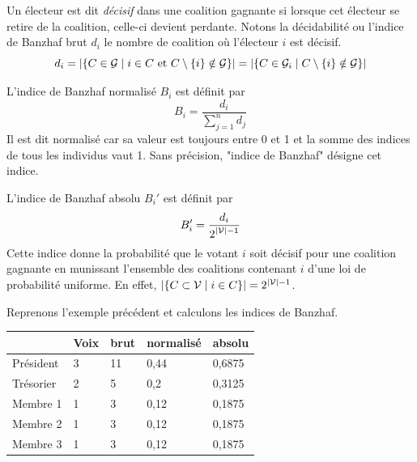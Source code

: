 \begin{definition}
	Un électeur est dit \textit{décisif} dans une coalition gagnante si lorsque cet électeur se retire de la coalition, celle-ci devient perdante. Notons la décidabilité ou l'indice de Banzhaf brut $d_i$ le nombre de coalition où l'électeur $i$ est décisif.
	\begin{equation}
		d_i
		= \left| \left\{ C \in \mathcal{G} \;|\; i \in C \text{ et } C \setminus \{i\} \notin \mathcal{G} \right\} \right|
		= \left| \left\{ C \in \mathcal{G}_i \;|\; C \setminus \{i\} \notin \mathcal{G} \right\} \right|
	\end{equation}
\end{definition}

\begin{definition}
	L'indice de Banzhaf normalisé $B_i$ est définit par
	\begin{equation}
		B_i = \frac{d_i}{\displaystyle \sum_{j=1}^{n} d_j}
	\end{equation}
	Il est dit normalisé car sa valeur est toujours entre 0 et 1 et la somme des indices de tous les individus vaut 1.
	Sans précision, "indice de Banzhaf" désigne cet indice.
	
	L'indice de Banzhaf absolu $B_i'$ est définit par
	\begin{equation}
		B_i' = \frac{d_i}{\displaystyle 2^{|\mathcal{V}| - 1}}
	\end{equation}
	Cette indice donne la probabilité que le votant $i$ soit décisif pour une coalition gagnante en munissant l'ensemble des coalitions contenant $i$ d'une loi de probabilité uniforme.
	En effet, $\left| \left\{ C \subset \mathcal{V} \;|\; i \in C \right\} \right| = 2^{|\mathcal{V}| - 1}$.
\end{definition}

\begin{exemple}
	Reprenons l'exemple précédent et calculons les indices de Banzhaf.
	\begin{center}
		\begin{tabular}{|l|l|l|l|l|}
		\hline
		& Voix & brut & normalisé & absolu \\
		\hline
		Président & 3 & 11 & 0,44 & 0,6875 \\
		\hline
		Trésorier & 2 & 5 & 0,2 & 0,3125 \\
		\hline
		Membre 1 & 1 & 3 & 0,12 & 0,1875 \\
		\hline
		Membre 2 & 1 & 3 & 0,12 & 0,1875 \\
		\hline
		Membre 3 & 1 & 3 & 0,12 & 0,1875 \\
		\hline
	\end{tabular}
	\end{center}
\end{exemple}


